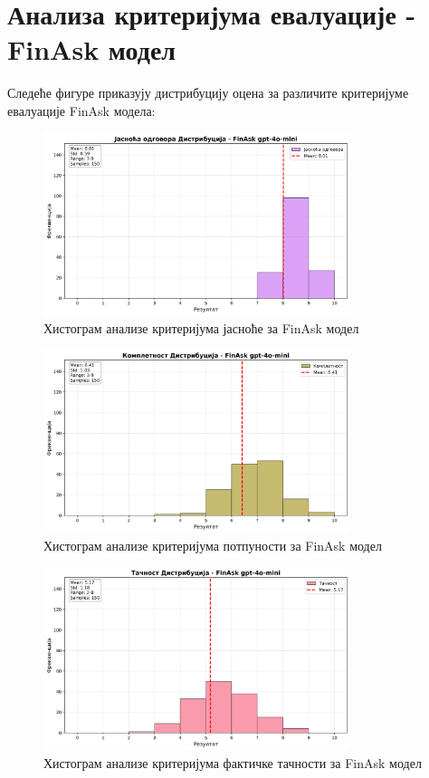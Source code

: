 \section{Анализа критеријума евалуације - FinAsk модел}

Следеће фигуре приказују дистрибуцију оцена за различите критеријуме евалуације FinAsk модела:

\begin{figure}[h]
    \centering
    \includegraphics[width=0.8\textwidth]{images/FinAsk/criteria_analysis_clarity_histogram.png}
    \caption{Хистограм анализе критеријума јасноће за FinAsk модел}
    \label{fig:finask_clarity}
\end{figure}

\begin{figure}[h]
    \centering
    \includegraphics[width=0.8\textwidth]{images/FinAsk/criteria_analysis_completeness_histogram.png}
    \caption{Хистограм анализе критеријума потпуности за FinAsk модел}
    \label{fig:finask_completeness}
\end{figure}

\begin{figure}[h]
    \centering
    \includegraphics[width=0.8\textwidth]{images/FinAsk/criteria_analysis_factual_correctness_histogram.png}
    \caption{Хистограм анализе критеријума фактичке тачности за FinAsk модел}
    \label{fig:finask_factual}
\end{figure}

